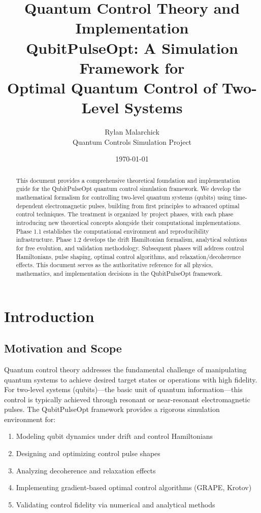 \documentclass[11pt,a4paper]{article}
\title{\textbf{Quantum Control Theory and Implementation}\\
\Large QubitPulseOpt: A Simulation Framework for\\
Optimal Quantum Control of Two-Level Systems}
\author{Rylan Malarchick\\
\small Quantum Controls Simulation Project}
\date{\today}
\theoremstyle{definition}
\theoremstyle{remark}
\begin{document}
\maketitle

\begin{abstract}
This document provides a comprehensive theoretical foundation and implementation guide for the QubitPulseOpt quantum control simulation framework. We develop the mathematical formalism for controlling two-level quantum systems (qubits) using time-dependent electromagnetic pulses, building from first principles to advanced optimal control techniques. The treatment is organized by project phases, with each phase introducing new theoretical concepts alongside their computational implementations. Phase 1.1 establishes the computational environment and reproducibility infrastructure. Phase 1.2 develops the drift Hamiltonian formalism, analytical solutions for free evolution, and validation methodology. Subsequent phases will address control Hamiltonians, pulse shaping, optimal control algorithms, and relaxation/decoherence effects. This document serves as the authoritative reference for all physics, mathematics, and implementation decisions in the QubitPulseOpt framework.
\end{abstract}

\tableofcontents
\newpage

\section{Introduction}

\subsection{Motivation and Scope}

Quantum control theory addresses the fundamental challenge of manipulating quantum systems to achieve desired target states or operations with high fidelity. For two-level systems (qubits)---the basic unit of quantum information---this control is typically achieved through resonant or near-resonant electromagnetic pulses. The QubitPulseOpt framework provides a rigorous simulation environment for:

\begin{enumerate}[label=(\roman*)]
    \item Modeling qubit dynamics under drift and control Hamiltonians
    \item Designing and optimizing control pulse shapes
    \item Analyzing decoherence and relaxation effects
    \item Implementing gradient-based optimal control algorithms (GRAPE, Krotov)
    \item Validating control fidelity via numerical and analytical methods
\end{enumerate}
\end{document}
